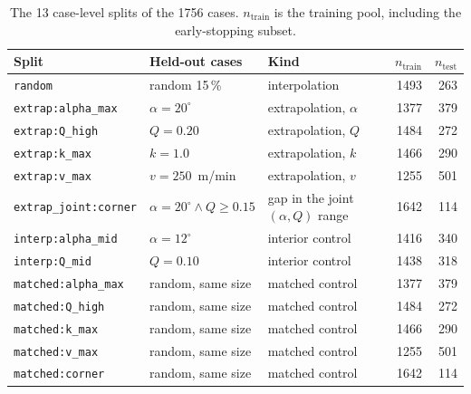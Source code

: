 \begin{table}[htbp]
\centering\small
\caption{The 13 case-level splits of the 1756 cases. $n_\text{train}$ is the training pool, including the early-stopping subset.} %
\label{tab:splits}
\begin{tabular}{@{}lllrr@{}}
\toprule
Split & Held-out cases & Kind & $n_\text{train}$ & $n_\text{test}$ \\
\midrule
\texttt{random}              & random 15\,\%                         & interpolation           & 1493 & 263 \\ %
\texttt{extrap:alpha\_max}   & $\alpha = 20^\circ$                   & extrapolation, $\alpha$ & 1377 & 379 \\ %
\texttt{extrap:Q\_high}      & $Q = 0.20$                            & extrapolation, $Q$      & 1484 & 272 \\ %
\texttt{extrap:k\_max}       & $k = 1.0$                             & extrapolation, $k$      & 1466 & 290 \\ %
\texttt{extrap:v\_max}       & $v = 250$~m/min                       & extrapolation, $v$      & 1255 & 501 \\ %
\texttt{extrap\_joint:corner}& $\alpha = 20^\circ \wedge Q \ge 0.15$ & gap in the joint $(\alpha, Q)$ range & 1642 & 114 \\ %
\texttt{interp:alpha\_mid}   & $\alpha = 12^\circ$                   & interior control        & 1416 & 340 \\ %
\texttt{interp:Q\_mid}       & $Q = 0.10$                            & interior control        & 1438 & 318 \\ %
\texttt{matched:alpha\_max}  & random, same size                     & matched control         & 1377 & 379 \\ %
\texttt{matched:Q\_high}     & random, same size                     & matched control         & 1484 & 272 \\ %
\texttt{matched:k\_max}      & random, same size                     & matched control         & 1466 & 290 \\ %
\texttt{matched:v\_max}      & random, same size                     & matched control         & 1255 & 501 \\ %
\texttt{matched:corner}      & random, same size                     & matched control         & 1642 & 114 \\ %
\bottomrule
\end{tabular}
\end{table}